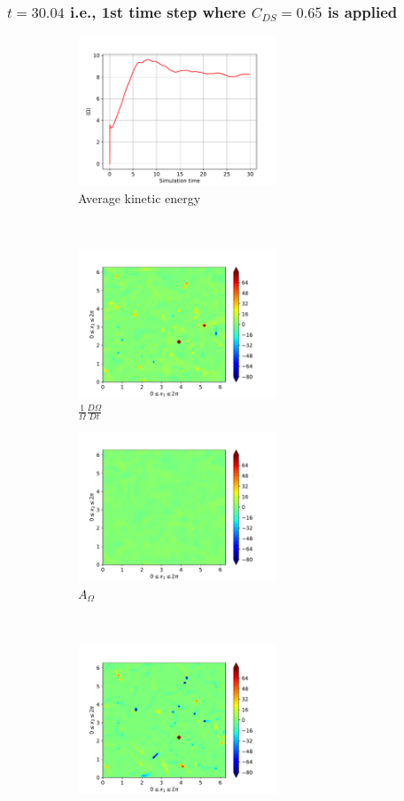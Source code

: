 \subsubsection{$t=30.04$ i.e., 1st time step where $C_{DS}=0.65$ is applied} 
\begin{figure}[H]
    \begin{subfigure}[H]{0.45\textwidth}
        \includegraphics[height=1.75in]{media/run-cds-65/enst-average1340}
        \caption{Average kinetic energy}
    \end{subfigure}
    ~
    \begin{subfigure}[H]{0.45\textwidth}
        \includegraphics[height=1.75in]{media/run-cds-65/enst-1340}
        \caption{$\frac{1}{\Omega} \frac{D \Omega}{Dt}$}
    \end{subfigure}
    \newline
    \begin{subfigure}{0.45\textwidth}
        \includegraphics[height=1.75in]{media/run-cds-65/A-enst-1340}
        \caption{$A_{\Omega}$}
    \end{subfigure}
    ~
    \begin{subfigure}{0.45\textwidth}
        \includegraphics[height=1.75in]{media/run-cds-65/Pi-enst-1340}

\end{subfigure}
\end{figure}
